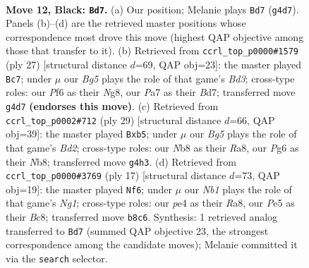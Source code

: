 \documentclass[11pt]{article}
\begin{document}
\clearpage

\begin{figure}[p]\centering
\begin{subfigure}{0.46\textwidth}\centering
\resizebox{\linewidth}{!}{%
\newchessgame
\chessboard[
  setfen={rn3rk1/ppp3bp/5pp1/4p3/2P1P1bN/2N5/PP3PP1/1RBBK2R b K - 1 12},
  showmover=false,
  pgfstyle=straightmove, color=movearrow, markmove={g4-d7}
]}
\caption{}
\end{subfigure}\hfill
\begin{subfigure}{0.46\textwidth}\centering
\resizebox{\linewidth}{!}{%
\newchessgame
\chessboard[
  setfen={2kr2nr/1p1b1ppp/p2bp3/8/8/5N2/PPP1BPPP/R1BR2K1 b - - 6 14},
  showmover=false,
  pgfstyle=straightmove, color=movearrow, markmove={d6-c7}
]}
\caption{}
\end{subfigure}
\\[4pt]
\begin{subfigure}{0.46\textwidth}\centering
\resizebox{\linewidth}{!}{%
\newchessgame
\chessboard[
  setfen={rn3rk1/1p1bpp1p/6p1/1B1P4/p2P4/2N5/PP3PPP/1R2K2R b K - 0 15},
  showmover=false,
  pgfstyle=straightmove, color=movearrow, markmove={d7-b5}
]}
\caption{}
\end{subfigure}\hfill
\begin{subfigure}{0.46\textwidth}\centering
\resizebox{\linewidth}{!}{%
\newchessgame
\chessboard[
  setfen={rnb1kbnr/p4ppp/2p5/8/PppNP3/8/1P3PPP/R1BNKB1R b KQkq - 1 9},
  showmover=false,
  pgfstyle=straightmove, color=movearrow, markmove={g8-f6}
]}
\caption{}
\end{subfigure}
\caption{\textbf{Move 12, Black: \texttt{Bd7}.} (a) Our position; Melanie plays \texttt{Bd7} (\texttt{g4d7}). Panels (b)--(d) are the retrieved master positions whose correspondence most drove this move (highest QAP objective among those that transfer to it). (b) Retrieved from \texttt{ccrl\_top\_p0000\#1579} (ply 27) [structural distance $d$=69, QAP obj=23]: the master played \texttt{Bc7}; under $\mu$ our \emph{Bg5} plays the role of that game's \emph{Bd3}; cross-type roles: our \emph{P}f6 as their \emph{N}g8, our \emph{P}a7 as their \emph{B}d7; transferred move \texttt{g4d7} \textbf{(endorses this move)}. (c) Retrieved from \texttt{ccrl\_top\_p0002\#712} (ply 29) [structural distance $d$=66, QAP obj=39]: the master played \texttt{Bxb5}; under $\mu$ our \emph{Bg5} plays the role of that game's \emph{Bd2}; cross-type roles: our \emph{N}b8 as their \emph{R}a8, our \emph{P}g6 as their \emph{N}b8; transferred move \texttt{g4h3}. (d) Retrieved from \texttt{ccrl\_top\_p0000\#3769} (ply 17) [structural distance $d$=73, QAP obj=19]: the master played \texttt{Nf6}; under $\mu$ our \emph{Nb1} plays the role of that game's \emph{Ng1}; cross-type roles: our \emph{p}e4 as their \emph{R}a8, our \emph{P}e5 as their \emph{B}c8; transferred move \texttt{b8c6}. Synthesis: 1 retrieved analog transferred to \texttt{Bd7} (summed QAP objective 23, the strongest correspondence among the candidate moves); Melanie committed it via the \texttt{search} selector.}
\label{fig:thought-m23}
\end{figure}
\end{document}
